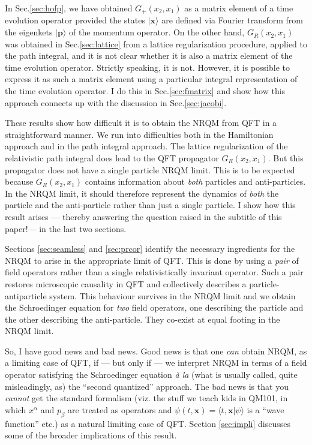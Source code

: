 \documentclass{article}
\def\ket#1{|#1\rangle}                    %
\def\amp#1#2{\langle #1 | #2\rangle}      %
\begin{document}
 In Sec.\ref{sec:hofp},  we  have obtained $G_+(x_2,x_1)$ as a matrix element of a time evolution operator provided the states $\ket{\bm{x}}$ are defined via Fourier transform from the eigenkets $\ket{\bm{p}}$ of the momentum operator. On the other hand, $G_R(x_2,x_1)$ was obtained in Sec.\ref{sec:lattice}  from a lattice regularization procedure, applied to the path integral,  and it is not clear whether it is also a matrix element of the time evolution operator. Strictly speaking, it is not. However, it is possible to express it as such a matrix element using a particular integral representation of the time evolution operator. I do this in Sec.\ref{sec:fmatrix} and show how this approach connects up with the  discussion in Sec.\ref{sec:jacobi}. 
 
 These results show how difficult it is to obtain the NRQM from QFT in a  straightforward manner. We run into difficulties  both in the Hamiltonian approach and in the path integral approach. The lattice regularization of the relativistic path integral does lead to the QFT propagator $G_R(x_2,x_1)$. But this propagator does not have a single particle NRQM limit. This is to be expected because $G_R(x_2,x_1)$ contains information about \textit{both} particles and anti-particles. In the NRQM limit, it should therefore represent the dynamics of \textit{both} the particle and the anti-particle rather than just a single particle. I show how this result arises --- thereby answering the question raised in the subtitle of this paper!--- in the last two sections. 
 
 Sections \ref{sec:seamless} and \ref{sec:prcor} identify the necessary ingredients for the NRQM to arise in the appropriate limit of QFT. This is done by using a \textit{pair} of field operators rather than a single relativistically invariant operator. Such a pair restores microscopic causality in QFT and collectively describes a particle-antiparticle system. This behaviour survives in the NRQM limit and we obtain the Schroedinger equation for \textit{two} field operators, one describing the particle and the other describing the anti-particle. They co-exist at equal footing in the NRQM limit. 
 

So, I have good news and bad news. Good news is that one \textit{can} obtain NRQM, as a limiting case of QFT, if --- but only if --- we interpret NRQM in terms of a field operator satisfying the Schroedinger equation \textit{\`{a} la} (what is usually called, quite misleadingly, as) the ``second quantized'' approach. The bad news is that you \textit{cannot} get the standard formalism (viz. the stuff we teach kids in QM101, in which $x^\alpha$ and $p_\beta$ are treated as operators and $\psi(t,\bm{x})=\amp{t,\bm{x}}{\psi}$ is a ``wave function'' etc.) as a natural limiting case of QFT. Section \ref{sec:impli} discusses some of the broader implications of this result.
\end{document}
